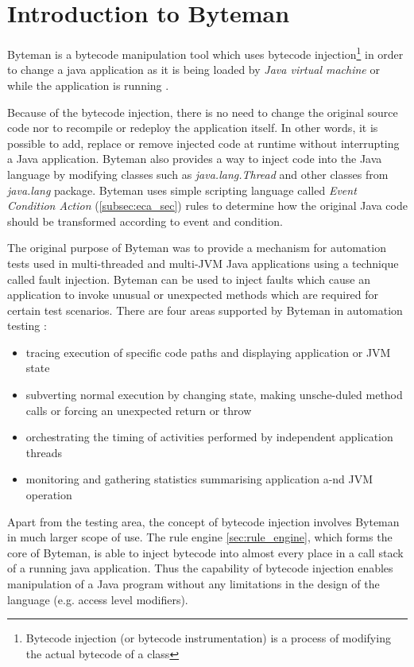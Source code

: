 \documentclass[12pt,oneside]{fithesis2}
\begin{document}
\section{Introduction to Byteman}
Byteman is a bytecode manipulation tool which uses bytecode injection\footnote{Bytecode injection (or bytecode instrumentation) is a process of modifying the actual bytecode of a class} in order to change a java application as it is being loaded by \textit{Java virtual machine} or while the application is running \cite[Introduction to Byteman]{byteman_doc}.

Because of the bytecode injection, there is no need to change the original source code nor to recompile or redeploy the application itself. In other words, it is possible to add, replace or remove injected code at runtime without interrupting a Java application. Byteman also provides a way to inject code into the Java language by modifying classes such as \textit{java.lang.Thread} and other classes from \textit{java.lang} package. Byteman uses simple scripting language called \textit{Event Condition Action} (\ref{subsec:eca_sec}) rules to determine how the original Java code should be transformed according to event and condition.

The original purpose of Byteman was to provide a mechanism for automation tests used in multi-threaded and multi-JVM Java applications using a technique called fault injection. Byteman can be used to inject faults which cause an application to invoke unusual or unexpected methods which are required for certain test scenarios. There are four areas supported by Byteman in automation testing \cite[Introduction to Byteman]{byteman_doc}:

\begin{itemize}
   \item tracing execution of specific code paths and displaying application or JVM state
   \item subverting normal execution by changing state, making unsche-duled method calls or forcing an unexpected return or throw
   \item orchestrating the timing of activities performed by independent application threads
   \item monitoring and gathering statistics summarising application a-nd JVM operation
\end{itemize}
Apart from the testing area, the concept of bytecode injection involves Byteman in much larger scope of use. The rule engine \ref{sec:rule_engine}, which forms the core of Byteman, is able to inject bytecode into almost every place in a call stack of a running java application. Thus the capability of bytecode injection enables manipulation of a Java program without any limitations in the design of the language (e.g. access level modifiers).
\end{document}
